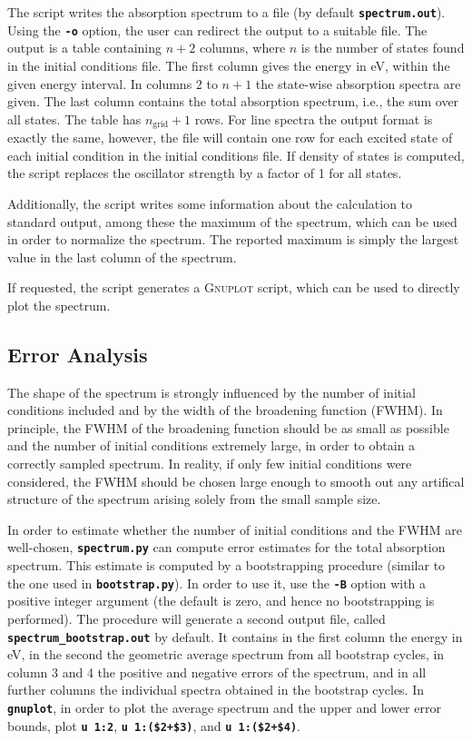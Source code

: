 \documentclass[a4paper,10pt,DIV=15,openany]{scrbook}
\newcommand{\ttt}[1]{\textbf{\texttt{#1}}}
\begin{document}
The script writes the absorption spectrum to a file (by default \ttt{spectrum.out}). Using the \ttt{-o} option, the user can redirect the output to a suitable file. The output is a table containing $n+2$ columns, where $n$ is the number of states found in the initial conditions file. The first column gives the energy in eV, within the given energy interval. In columns 2 to $n+1$ the state-wise absorption spectra are given. The last column contains the total absorption spectrum, i.e., the sum over all states. The table has $n_{\text{grid}}+1$ rows. For line spectra the output format is exactly the same, however, the file will contain one row for each excited state of each initial condition in the initial conditions file. If density of states is computed, the script replaces the oscillator strength by a factor of 1 for all states.

Additionally, the script writes some information about the calculation to standard output, among these the maximum of the spectrum, which can be used in order to normalize the spectrum. The reported maximum is simply the largest value in the last column of the spectrum. 

If requested, the script generates a \textsc{Gnuplot} script, which can be used to directly plot the spectrum. 

\subsection{Error Analysis}

The shape of the spectrum is strongly influenced by the number of initial conditions included and by the width of the broadening function (FWHM).
In principle, the FWHM of the broadening function should be as small as possible and the number of initial conditions extremely large, in order to obtain a correctly sampled spectrum.
In reality, if only few initial conditions were considered, the FWHM should be chosen large enough to smooth out any artifical structure of the spectrum arising solely from the small sample size.

In order to estimate whether the number of initial conditions and the FWHM are well-chosen, \ttt{spectrum.py} can compute error estimates for the total absorption spectrum.
This estimate is computed by a bootstrapping procedure (similar to the one used in \ttt{bootstrap.py}).
In order to use it, use the \ttt{-B} option with a positive integer argument (the default is zero, and hence no bootstrapping is performed).
The procedure will generate a second output file, called \ttt{spectrum\_bootstrap.out} by default.
It contains in the first column the energy in eV, in the second the geometric average spectrum from all bootstrap cycles, in column 3 and 4 the positive and negative errors of the spectrum, and in all further columns the individual spectra obtained in the bootstrap cycles.
In \ttt{gnuplot}, in order to plot the average spectrum and the upper and lower error bounds, plot \ttt{u 1:2}, \ttt{u 1:(\$2+\$3)}, and \ttt{u 1:(\$2+\$4)}.
\end{document}
